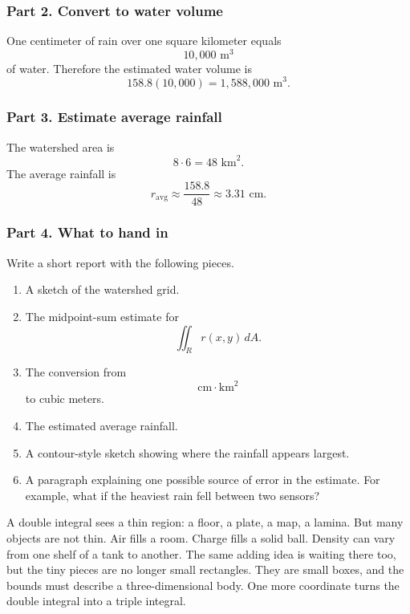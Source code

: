 \subsubsection*{Part 2. Convert to water volume}

One centimeter of rain over one square kilometer equals
\[
    10{,}000\text{ m}^3
\]
of water.  Therefore the estimated water volume is
\[
\boxed{
    158.8(10{,}000)=1{,}588{,}000\text{ m}^3.
}
\]

\subsubsection*{Part 3. Estimate average rainfall}

The watershed area is
\[
    8\cdot6=48\text{ km}^2.
\]
The average rainfall is
\[
\boxed{
    r_{\mathrm{avg}}
    \approx
    \frac{158.8}{48}
    \approx
    3.31\text{ cm}.
}
\]

\subsubsection*{Part 4. What to hand in}

Write a short report with the following pieces.

\begin{enumerate}
\item A sketch of the watershed grid.

\item The midpoint-sum estimate for
\[
    \iint_R r(x,y)\,dA.
\]

\item The conversion from
\[
    \text{cm}\cdot\text{km}^2
\]
to cubic meters.

\item The estimated average rainfall.

\item A contour-style sketch showing where the rainfall appears largest.

\item A paragraph explaining one possible source of error in the estimate.  For example,
what if the heaviest rain fell between two sensors?
\end{enumerate}

A double integral sees a thin region: a floor, a plate, a map, a lamina.  But many
objects are not thin.  Air fills a room.  Charge fills a solid ball.  Density can vary from
one shelf of a tank to another.  The same adding idea is waiting there too, but the tiny
pieces are no longer small rectangles.  They are small boxes, and the bounds must
describe a three-dimensional body.  One more coordinate turns the double integral into
a triple integral.